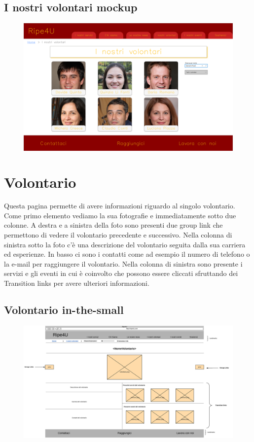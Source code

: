         \subsection{I nostri volontari mockup}
        \begin{figure}[H]
            \centering
            \includegraphics[scale=0.18]{resources/images/iNostriVolontari-mockup.png}
        \end{figure}

    \section{Volontario}
    Questa pagina permette di avere informazioni riguardo al singolo volontario.
    Come primo elemento vediamo la sua fotografie e immediatamente sotto due
    colonne. A destra e a sinistra della foto sono presenti due group link che
    permettono di vedere il volontario precedente e successivo. Nella colonna di
    sinistra sotto la foto c'è una descrizione del volontario seguita dalla sua
    carriera ed esperienze. In basso ci sono i contatti come ad esempio il
    numero di telefono o la e-mail per raggiungere il volontario. Nella colonna
    di sinistra sono presente i servizi e gli eventi in cui è coinvolto che
    possono essere cliccati sfruttando dei Transition links per avere ulteriori
    informazioni.

        \subsection{Volontario in-the-small}
        \begin{figure}[H]
            \centering
            \includegraphics[scale=0.35]{resources/images/volontario-in-the-small.jpg}
        \end{figure}

